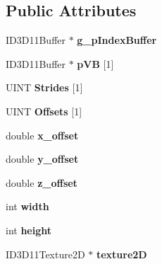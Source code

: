 \subsection*{Public Attributes}
\begin{DoxyCompactItemize}
\item 
\hypertarget{classcylinder_afd05a7ea03d615e32c5e4fa31f0d87a5}{I\+D3\+D11\+Buffer $\ast$ {\bfseries g\+\_\+p\+Index\+Buffer}}\label{classcylinder_afd05a7ea03d615e32c5e4fa31f0d87a5}

\item 
\hypertarget{classcylinder_a9862cba4b8618b9c024abbd810e43164}{I\+D3\+D11\+Buffer $\ast$ {\bfseries p\+V\+B} \mbox{[}1\mbox{]}}\label{classcylinder_a9862cba4b8618b9c024abbd810e43164}

\item 
\hypertarget{classcylinder_aaaa446c2189b3f5f91015d1395133add}{U\+I\+N\+T {\bfseries Strides} \mbox{[}1\mbox{]}}\label{classcylinder_aaaa446c2189b3f5f91015d1395133add}

\item 
\hypertarget{classcylinder_a2140f05bb1b96e329f0b5cf0d9052c72}{U\+I\+N\+T {\bfseries Offsets} \mbox{[}1\mbox{]}}\label{classcylinder_a2140f05bb1b96e329f0b5cf0d9052c72}

\item 
\hypertarget{classcylinder_a21931a63da31a2a458d081963cb3fc91}{double {\bfseries x\+\_\+offset}}\label{classcylinder_a21931a63da31a2a458d081963cb3fc91}

\item 
\hypertarget{classcylinder_ac26af7ac580e99b212277d49fdd75b8b}{double {\bfseries y\+\_\+offset}}\label{classcylinder_ac26af7ac580e99b212277d49fdd75b8b}

\item 
\hypertarget{classcylinder_ab11275566469605e6a518edcc40bf920}{double {\bfseries z\+\_\+offset}}\label{classcylinder_ab11275566469605e6a518edcc40bf920}

\item 
\hypertarget{classcylinder_af0e86117b173c2e7817b3d70b837a0b4}{int {\bfseries width}}\label{classcylinder_af0e86117b173c2e7817b3d70b837a0b4}

\item 
\hypertarget{classcylinder_a97e337f5b7a95cca22a2558483221fe2}{int {\bfseries height}}\label{classcylinder_a97e337f5b7a95cca22a2558483221fe2}

\item 
\hypertarget{classcylinder_ad3aee2909b4526c87743c2b9f2c8f776}{I\+D3\+D11\+Texture2\+D $\ast$ {\bfseries texture2\+D}}\label{classcylinder_ad3aee2909b4526c87743c2b9f2c8f776}


\end{DoxyCompactItemize}
